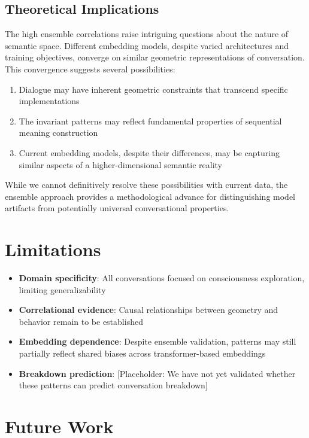 \documentclass[11pt,letterpaper]{article}
\begin{document}
\subsection{Theoretical Implications}

The high ensemble correlations raise intriguing questions about the nature of semantic space. Different embedding models, despite varied architectures and training objectives, converge on similar geometric representations of conversation. This convergence suggests several possibilities:

\begin{enumerate}
\item Dialogue may have inherent geometric constraints that transcend specific implementations
\item The invariant patterns may reflect fundamental properties of sequential meaning construction
\item Current embedding models, despite their differences, may be capturing similar aspects of a higher-dimensional semantic reality
\end{enumerate}

While we cannot definitively resolve these possibilities with current data, the ensemble approach provides a methodological advance for distinguishing model artifacts from potentially universal conversational properties.

\section{Limitations}

\begin{itemize}
\item \textbf{Domain specificity}: All conversations focused on consciousness exploration, limiting generalizability
\item \textbf{Correlational evidence}: Causal relationships between geometry and behavior remain to be established
\item \textbf{Embedding dependence}: Despite ensemble validation, patterns may still partially reflect shared biases across transformer-based embeddings
\item \textbf{Breakdown prediction}: [Placeholder: We have not yet validated whether these patterns can predict conversation breakdown]
\end{itemize}

\section{Future Work}
\end{document}
